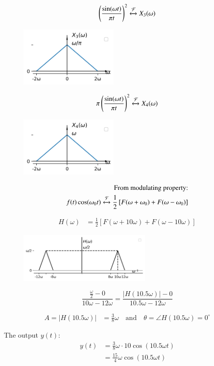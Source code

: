 \documentclass[journal,12pt,twocolumn]{IEEEtran}
\begin{document}
\begin{align}
\left(\frac{\sin(\omega t)}{\pi t}\right)^2  \xleftrightarrow{\mathcal{F}} X_3(\omega) 
\end{align}
\begin{figure}[h!]
    \centering
    \includegraphics[width=0.5\columnwidth, height=3cm]{figs/plot1.png}
    \caption{}
    \label{fig:sr1}
\end{figure}
\begin{align}
\pi\left(\frac{\sin(\omega t)}{\pi t}\right)^2 \xleftrightarrow{\mathcal{F}} X_4(\omega)
\end{align}
\begin{figure}[h!]
    \centering
    \includegraphics[width=0.5\columnwidth, height=3cm]{figs/plot2.png}
    \caption{}
    \label{fig:sr1}
\end{figure}
    \begin{align}
\text{From modulating property:} \nonumber \\
        f(t) \cos(\omega_0 t) \xleftrightarrow{\mathcal{F}} \frac{1}{2} \left[F(\omega + \omega_0) + F(\omega - \omega_0)\right]
    \end{align}

    \begin{align}
        H(\omega) &= \frac{1}{2} \left[F(\omega + 10\omega) + F(\omega - 10\omega)\right]
    \end{align}

\begin{figure}[h!]
    \centering
    \includegraphics[width=0.7\columnwidth,height=2.5cm]{figs/plot3.png}
    \caption{}
    \label{fig:sr1}
\end{figure}
\begin{equation}
    \frac{\frac{\omega}{2} - 0}{10\omega - 12\omega} = \frac{|H(10.5\omega)| - 0}{10.5\omega - 12\omega}
\end{equation}

\begin{align}
A = |H(10.5\omega)| &= \frac{3}{8}\omega \quad \text{and} \quad  \theta= \angle H(10.5\omega) = 0^\circ
\end{align}

The output \(y(t)\):
\begin{align}
y(t) &= \frac{3}{8}\omega \cdot 10 \cos(10.5 \omega t) \\
&= \frac{15}{4}\omega \cos(10.5 \omega t)
\end{align}
\end{document}
